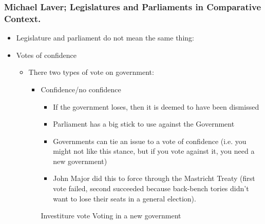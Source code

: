 \documentclass[11pt]{article}
\begin{document}
\subsubsection{Michael Laver; Legislatures and Parliaments in Comparative Context.}
\label{sec:orgfd7b6d4}
\begin{itemize}
\item Legislature and parliament do not mean the same thing:
\item Votes of confidence
\begin{itemize}
\item There two types of vote on government:
\begin{itemize}
\item Confidence/no confidence
\begin{itemize}
\item If the government loses, then it is deemed to have been dismissed
\item Parliament has a big stick to use against the Government
\item Governments can tie an issue to a vote of confidence (i.e. you might not
like this stance, but if you vote against it, you need a new government)
\item John Major did this to force through the Mastricht Treaty (first vote
failed, second succeeded because back-bench tories didn't want to lose
their seats in a general election).
\end{itemize}
\item[{Investiture vote}] Voting in a new government
\end{itemize}
\end{itemize}

\end{itemize}
\end{document}
